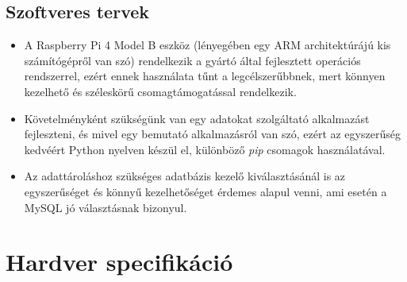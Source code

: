 \documentclass[11pt, a4paper]{article}
\begin{document}
		\subsection{Szoftveres tervek}
			\begin{itemize}
				\justifying
				\item A Raspberry Pi 4 Model B eszköz (lényegében egy ARM architektúrájú kis számítógépről van szó) rendelkezik a gyártó által fejlesztett operációs rendszerrel, ezért ennek használata tűnt a legcélszerűbbnek, mert könnyen kezelhető és széleskörű csomagtámogatással rendelkezik.
				
				\item Követelményként szükségünk van egy adatokat szolgáltató alkalmazást fejleszteni, és mivel egy bemutató alkalmazásról van szó, ezért az egyszerűség kedvéért Python nyelven készül el, különböző \emph{pip} csomagok használatával.
				
				\item Az adattároláshoz szükséges adatbázis kezelő kiválasztásánál is az egyszerűséget és könnyű kezelhetőséget érdemes alapul venni, ami esetén a MySQL jó választásnak bizonyul.
			\end{itemize}
		\vfill
	
	\section{Hardver specifikáció}
\end{document}
